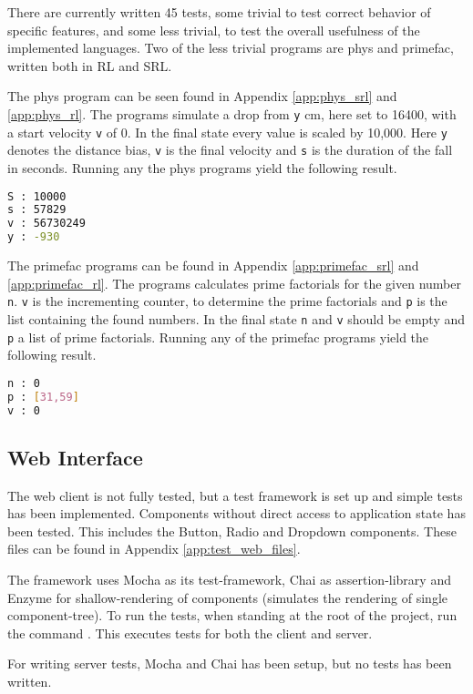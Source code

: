 There are currently written 45 tests, some trivial to test correct behavior of specific features, and some less trivial, to test the overall usefulness of the implemented languages.
Two of the less trivial programs are phys and primefac, written both in RL and SRL.

The phys program can be seen found in Appendix \ref{app:phys_srl} and \ref{app:phys_rl}.
The programs simulate a drop from \texttt{y} cm, here set to 16400, with a start velocity \texttt{v} of 0.
In the final state every value is scaled by 10,000.
Here \texttt{y} denotes the distance bias, \texttt{v} is the final velocity and \texttt{s} is the duration of the fall in seconds.
Running any the phys programs yield the following result.

\begin{lstlisting}[language=sh]
S : 10000
s : 57829
v : 56730249
y : -930
\end{lstlisting}

The primefac programs can be found in Appendix \ref{app:primefac_srl} and \ref{app:primefac_rl}.
The programs calculates prime factorials for the given number \texttt{n}.
\texttt{v} is the incrementing counter, to determine the prime factorials and \texttt{p} is the list containing the found numbers.
In the final state \texttt{n} and \texttt{v} should be empty and \texttt{p} a list of prime factorials.
Running any of the primefac programs yield the following result.

\begin{lstlisting}[language=sh]
n : 0
p : [31,59]
v : 0
\end{lstlisting}

\subsection{Web Interface}

The web client is not fully tested, but a test framework is set up and simple tests has been implemented. Components without direct access to application state has been tested. This includes the Button, Radio and Dropdown components.
These files can be found in Appendix \ref{app:test_web_files}.

The framework uses Mocha as its test-framework, Chai as assertion-library and Enzyme for shallow-rendering of components (simulates the rendering of single component-tree).
To run the tests, when standing at the root of the project, run the command .
This executes tests for both the client and server.

For writing server tests, Mocha and Chai has been setup, but no tests has been written.

